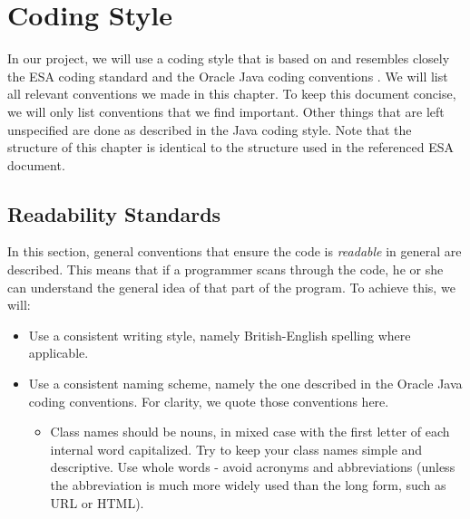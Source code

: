 \chapter{Coding Style}
In our project, we will use a coding style that is based on and resembles closely the ESA coding standard \cite{esa-coding-style} and the Oracle Java coding conventions \cite{oracle-java-coding-style}. We will list all relevant conventions we made in this chapter. To keep this document concise, we will only list conventions that we find important. Other things that are left unspecified are done as described in the Java coding style. Note that the structure of this chapter is identical to the structure used in the referenced ESA document.

\section{Readability Standards}
In this section, general conventions that ensure the code is \emph{readable} in general are described. This means that if a programmer scans through the code, he or she can understand the general idea of that part of the program. To achieve this, we will:

\begin{itemize}
	\item Use a consistent writing style, namely British-English spelling where applicable.
	\item Use a consistent naming scheme, namely the one described in the Oracle Java coding conventions. For clarity, we quote those conventions here.
		\begin{itemize}
			\item Class names should be nouns, in mixed case with the first letter of each internal word capitalized. Try to keep your class names simple and descriptive. Use whole words - avoid acronyms and abbreviations (unless the abbreviation is much more widely used than the long form, such as URL or HTML).
		\end{itemize}
\end{itemize}